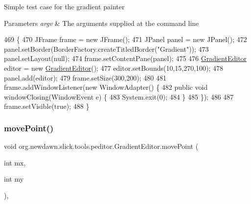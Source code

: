 Simple test case for the gradient painter


\begin{DoxyParams}{Parameters}
{\em argv} & The arguments supplied at the command line \\
\hline
\end{DoxyParams}

\begin{DoxyCode}
469                                            \{
470         JFrame frame = \textcolor{keyword}{new} JFrame();
471         JPanel panel = \textcolor{keyword}{new} JPanel();
472         panel.setBorder(BorderFactory.createTitledBorder(\textcolor{stringliteral}{"Gradient"}));
473         panel.setLayout(null);
474         frame.setContentPane(panel);
475             
476         \mbox{\hyperlink{classorg_1_1newdawn_1_1slick_1_1tools_1_1peditor_1_1_gradient_editor_a7a25caadeab2ef681a8b0be92e50c840}{GradientEditor}} editor = \textcolor{keyword}{new} \mbox{\hyperlink{classorg_1_1newdawn_1_1slick_1_1tools_1_1peditor_1_1_gradient_editor_a7a25caadeab2ef681a8b0be92e50c840}{GradientEditor}}();
477         editor.setBounds(10,15,270,100);
478         panel.add(editor);
479         frame.setSize(300,200);
480         
481         frame.addWindowListener(\textcolor{keyword}{new} WindowAdapter() \{
482             \textcolor{keyword}{public} \textcolor{keywordtype}{void} windowClosing(WindowEvent e) \{
483                 System.exit(0);
484             \}
485         \});
486         
487         frame.setVisible(\textcolor{keyword}{true});
488     \}
\end{DoxyCode}
\mbox{\label{classorg_1_1newdawn_1_1slick_1_1tools_1_1peditor_1_1_gradient_editor_a30e2f666b4ba90807cab506b0547c87c}} 
\subsubsection{\texorpdfstring{move\+Point()}{movePoint()}}
{\footnotesize\ttfamily void org.\+newdawn.\+slick.\+tools.\+peditor.\+Gradient\+Editor.\+move\+Point (\begin{DoxyParamCaption}\item[{int}]{mx,  }\item[{int}]{my }\end{DoxyParamCaption})\hspace{0.3cm}{\ttfamily [inline]}, {\ttfamily [private]}}

